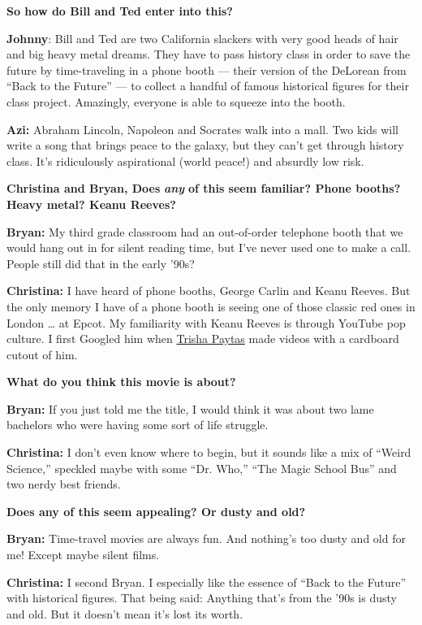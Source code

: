 \textbf{So how do Bill and Ted enter into this?}

\textbf{Johnny}: Bill and Ted are two California slackers with very good
heads of hair and big heavy metal dreams. They have to pass history
class in order to save the future by time-traveling in a phone booth ---
their version of the DeLorean from ``Back to the Future'' --- to collect
a handful of famous historical figures for their class project.
Amazingly, everyone is able to squeeze into the booth.

\textbf{Azi:} Abraham Lincoln, Napoleon and Socrates walk into a mall.
Two kids will write a song that brings peace to the galaxy, but they
can't get through history class. It's ridiculously aspirational (world
peace!) and absurdly low risk.

\textbf{Christina and Bryan, Does} \emph{\textbf{any}} \textbf{of this
seem familiar? Phone booths? Heavy metal? Keanu Reeves?}

\textbf{Bryan:} My third grade classroom had an out-of-order telephone
booth that we would hang out in for silent reading time, but I've never
used one to make a call. People still did that in the early '90s?

\textbf{Christina:} I have heard of phone booths, George Carlin and
Keanu Reeves. But the only memory I have of a phone booth is seeing one
of those classic red ones in London \ldots{} at Epcot. My familiarity
with Keanu Reeves is through YouTube pop culture. I first Googled him
when \href{https://www.youtube.com/watch?v=T1hT1ANEGC0}{Trisha Paytas}
made videos with a cardboard cutout of him.

\textbf{What do you think this movie is about?}

\textbf{Bryan:} If you just told me the title, I would think it was
about two lame bachelors who were having some sort of life struggle.

\textbf{Christina:} I don't even know where to begin, but it sounds like
a mix of ``Weird Science,'' speckled maybe with some ``Dr. Who,'' ``The
Magic School Bus'' and two nerdy best friends.

\textbf{Does any of this seem appealing? Or dusty and old?}

\textbf{Bryan:} Time-travel movies are always fun. And nothing's too
dusty and old for me! Except maybe silent films.

\textbf{Christina:} I second Bryan. I especially like the essence of
``Back to the Future'' with historical figures. That being said:
Anything that's from the '90s is dusty and old. But it doesn't mean it's
lost its worth.

